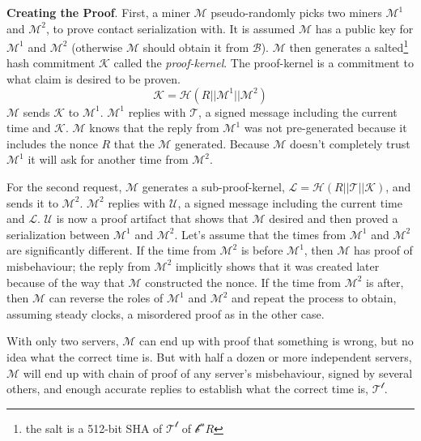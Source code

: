 \documentclass[letterpaper,11pt]{article}
\begin{document}
\textbf{Creating the Proof}. First, a miner $\mathcal{M}$ pseudo-randomly picks two miners $\mathcal{M^1}$ and $\mathcal{M^2}$, to prove contact serialization with. It is assumed $\mathcal{M}$ has a public key for $\mathcal{M^1}$ and $\mathcal{M^2}$ (otherwise $\mathcal{M}$ should obtain it from $\mathcal{B}$). $\mathcal{M}$ then generates a salted\footnote{the salt is a 512-bit SHA of $\mathcal{T^t}$ of $\mathcal{b^n}$$R$} hash commitment $\mathcal{K}$ called the \textit{proof-kernel}. The proof-kernel is a commitment to what claim is desired to be proven. $$\mathcal{K} = \mathcal{H}(R || \mathcal{M^1} || \mathcal{M^2})$$ $\mathcal{M}$ sends $\mathcal{K}$ to $\mathcal{M^1}$. $\mathcal{M^1}$ replies with $\mathcal{T}$, a signed message including the current time and $\mathcal{K}$. $\mathcal{M}$ knows that the reply from $\mathcal{M^1}$ was not pre-generated because it includes the nonce $R$ that the $\mathcal{M}$ generated. Because $\mathcal{M}$ doesn't completely trust $\mathcal{M^1}$ it will ask for another time from $\mathcal{M^2}$.\newline

For the second request, $\mathcal{M}$ generates a sub-proof-kernel, $\mathcal{L} = \mathcal{H}(R || \mathcal{T} || \mathcal{K})$, and sends it to $\mathcal{M^2}$. $\mathcal{M^2}$ replies with $\mathcal{U}$, a signed message including the current time and $\mathcal{L}$. $\mathcal{U}$ is now a proof artifact that shows that $\mathcal{M}$ desired and then proved a serialization between $\mathcal{M^1}$ and $\mathcal{M^2}$. Let's assume that the times from $\mathcal{M^1}$ and $\mathcal{M^2}$ are significantly different. If the time from $\mathcal{M^2}$ is before $\mathcal{M^1}$, then $\mathcal{M}$ has proof of misbehaviour; the reply from $\mathcal{M^2}$ implicitly shows that it was created later because of the way that $\mathcal{M}$ constructed the nonce. If the time from $\mathcal{M^2}$ is after, then $\mathcal{M}$ can reverse the roles of $\mathcal{M^1}$ and $\mathcal{M^2}$ and repeat the process to obtain, assuming steady clocks, a misordered proof as in the other case.\newline

With only two servers, $\mathcal{M}$ can end up with proof that something is wrong, but no idea what the correct time is. But with half a dozen or more independent servers, $\mathcal{M}$ will end up with chain of proof of any server's misbehaviour, signed by several others, and enough accurate replies to establish what the correct time is, $\mathcal{T^t}$.\newline
\end{document}
